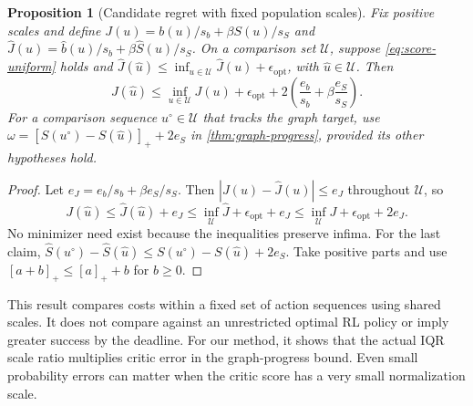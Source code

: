 \documentclass{article}
\newtheorem{proposition}[theorem]{Proposition}
\theoremstyle{definition}
\theoremstyle{remark}
\begin{document}
\begin{proposition}[Candidate regret with fixed population scales]
\label{prop:candidate-regret}
Fix positive scales and define
$J(u)=b(u)/s_b+\beta S(u)/s_S$ and
$\widehat J(u)=\widehat b(u)/s_b+\beta\widehat S(u)/s_S$.
On a comparison set $\mathcal U$, suppose \cref{eq:score-uniform} holds and
$\widehat J(\hat u)\le\inf_{u\in\mathcal U}\widehat J(u)+\epsilon_{\mathrm{opt}}$,
with $\hat u\in\mathcal U$. Then
\begin{equation}
 J(\hat u)\le\inf_{u\in\mathcal U}J(u)+\epsilon_{\mathrm{opt}}
             +2\left(\frac{e_b}{s_b}+\beta\frac{e_S}{s_S}\right).
 \label{eq:candidate-regret}
\end{equation}
For a comparison sequence $u^\circ\in\mathcal U$ that tracks the graph target, use
$\omega=[S(u^\circ)-S(\hat u)]_++2e_S$ in \cref{thm:graph-progress},
provided its other hypotheses hold.
\end{proposition}
\begin{proof}
Let $e_J=e_b/s_b+\beta e_S/s_S$.
Then $|J(u)-\widehat J(u)|\le e_J$ throughout $\mathcal U$, so
\[
 J(\hat u)\le\widehat J(\hat u)+e_J
 \le\inf_{\mathcal U}\widehat J+\epsilon_{\mathrm{opt}}+e_J
 \le\inf_{\mathcal U}J+\epsilon_{\mathrm{opt}}+2e_J .
\]
No minimizer need exist because the inequalities preserve infima.
For the last claim,
$\widehat S(u^\circ)-\widehat S(\hat u)
 \le S(u^\circ)-S(\hat u)+2e_S$.
Take positive parts and use $[a+b]_+\le[a]_++b$ for $b\ge0$.
\end{proof}
This result compares costs within a fixed set of action sequences using shared scales.
It does not compare against an unrestricted optimal RL policy or imply greater
success by the deadline. For our method, it shows that the actual IQR scale ratio
multiplies critic error in the graph-progress bound. Even small probability errors
can matter when the critic score has a very small normalization scale.
\end{document}

